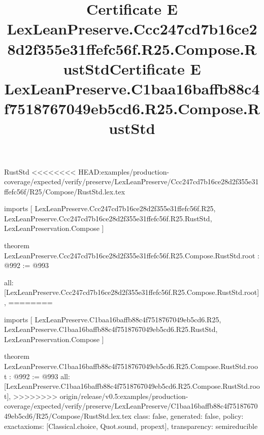 \begin{lexlean}{RustStd}
<<<<<<<< HEAD:examples/production-coverage/expected/verify/preserve/LexLeanPreserve/Ccc247cd7b16ce28d2f355e31ffefc56f/R25/Compose/RustStd.lex.tex
\title{Certificate E LexLeanPreserve.Ccc247cd7b16ce28d2f355e31ffefc56f.R25.Compose.RustStd}
\begin{coremodule}
imports [
  LexLeanPreserve.Ccc247cd7b16ce28d2f355e31ffefc56f.R25,
  LexLeanPreserve.Ccc247cd7b16ce28d2f355e31ffefc56f.R25.RustStd,
  LexLeanPreservation.Compose
]

theorem LexLeanPreserve.Ccc247cd7b16ce28d2f355e31ffefc56f.R25.Compose.RustStd.root : @992 := @993 {
  all: [LexLeanPreserve.Ccc247cd7b16ce28d2f355e31ffefc56f.R25.Compose.RustStd.root],
========
\title{Certificate E LexLeanPreserve.C1baa16baffb88c4f7518767049eb5cd6.R25.Compose.RustStd}
\begin{coremodule}
imports [
  LexLeanPreserve.C1baa16baffb88c4f7518767049eb5cd6.R25,
  LexLeanPreserve.C1baa16baffb88c4f7518767049eb5cd6.R25.RustStd,
  LexLeanPreservation.Compose
]

theorem LexLeanPreserve.C1baa16baffb88c4f7518767049eb5cd6.R25.Compose.RustStd.root : @992 := @993 {
  all: [LexLeanPreserve.C1baa16baffb88c4f7518767049eb5cd6.R25.Compose.RustStd.root],
>>>>>>>> origin/release/v0.5:examples/production-coverage/expected/verify/preserve/LexLeanPreserve/C1baa16baffb88c4f7518767049eb5cd6/R25/Compose/RustStd.lex.tex
  class: false,
  generated: false,
  policy: exact{axioms: [Classical.choice, Quot.sound, propext]},
  transparency: semireducible
}


\end{coremodule}}
\end{coremodule}
\end{lexlean}
